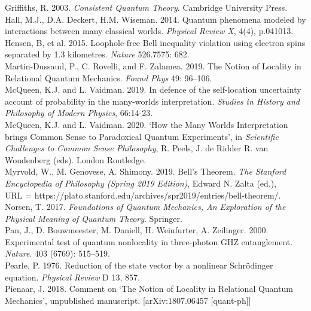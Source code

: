 \documentclass[a4paper]{article}
\begin{document}
Griffiths, R. 2003. \textit{Consistent Quantum Theory}. Cambridge University Press.\\

Hall, M.J., D.A. Deckert, H.M. Wiseman. 2014. Quantum phenomena modeled by interactions between many classical worlds. \textit{Physical Review X}, 4(4), p.041013.\\

Hensen, B, et al. 2015. Loophole-free Bell inequality violation using electron spins separated by 1.3 kilometres. \textit{Nature} 526.7575: 682.\\

Martin-Dussaud, P., C. Rovelli, and F. Zalamea. 2019. The Notion of Locality in Relational Quantum Mechanics. \textit{Found Phys} 49: 96–106.\\

McQueen, K.J. and L. Vaidman. 2019.
In defence of the self-location uncertainty account of probability in the many-worlds interpretation.
\textit{Studies in History and Philosophy of Modern Physics}, 66:14-23.\\

McQueen, K.J. and L. Vaidman. 2020. `How the Many Worlds Interpretation brings Common Sense to Paradoxical Quantum Experiments', in \textit{Scientific Challenges to Common Sense Philosophy}, R. Peels, J. de Ridder R. van Woudenberg (eds). London Routledge.\\ 

Myrvold, W., M. Genovese, A. Shimony. 2019. Bell's Theorem. \textit{The Stanford Encyclopedia of Philosophy (Spring 2019 Edition)}, Edward N. Zalta (ed.),\\ URL = {https://plato.stanford.edu/archives/spr2019/entries/bell-theorem/}.\\

Norsen, T. 2017. \textit{Foundations of Quantum Mechanics, An Exploration of the Physical Meaning of Quantum Theory}. Springer.\\

Pan, J., D. Bouwmeester, M. Daniell, H. Weinfurter, A. Zeilinger. 2000. Experimental test of quantum nonlocality in three-photon GHZ entanglement. \textit{Nature}. 403 (6769): 515–519.\\

Pearle, P. 1976. Reduction of the state vector by a nonlinear Schr\"{o}dinger equation. \textit{Physical Review} D 13, 857.\\

Pienaar, J. 2018. Comment on `The Notion of Locality in Relational Quantum Mechanics', unpublished manuscript. [arXiv:1807.06457 [quant-ph]]\\
\end{document}
